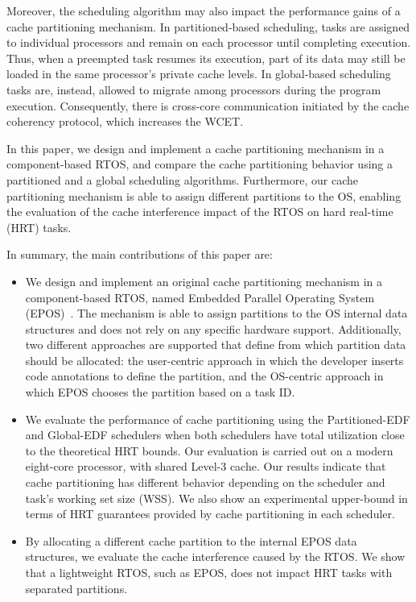 \documentclass[10pt, conference, compsocconf]{IEEEtran}
\begin{document}
Moreover, the scheduling algorithm may also impact the performance gains of a cache partitioning mechanism. In partitioned-based scheduling, tasks are assigned to individual processors and remain on each processor until completing execution. Thus, when a preempted task resumes its execution, part of its data may still be loaded in the same processor's private cache levels. In global-based scheduling tasks are, instead, allowed to migrate among processors during the program execution. Consequently, there is cross-core communication initiated by the cache coherency protocol, which increases the WCET. 

In this paper, we design and implement a cache partitioning mechanism in a component-based RTOS, and compare the cache partitioning behavior using a partitioned and a global scheduling algorithms. Furthermore, our cache partitioning mechanism is able to assign different partitions to the OS, enabling the evaluation of the cache interference impact of the RTOS on hard real-time (HRT) tasks.

In summary, the main contributions of this paper are:

\begin{itemize}
	\item We design and implement an original cache partitioning mechanism in a component-based RTOS, named Embedded Parallel Operating System (EPOS)~\cite{Froehlich:2001,epos}. The mechanism is able to assign partitions to the OS internal data structures and does not rely on any specific hardware support. Additionally, two different approaches are supported that define from which partition data should be allocated: the user-centric approach in which the developer inserts code annotations to define the partition, and the OS-centric approach in which EPOS chooses the partition based on a task ID. 
	
	\item We evaluate the performance of cache partitioning using the Partitioned-EDF and Global-EDF schedulers when both schedulers have total utilization close to the theoretical HRT bounds. Our evaluation is carried out on a modern eight-core processor, with shared Level-3 cache. Our results indicate that cache partitioning has different behavior depending on the scheduler and task's working set size (WSS). We also show an experimental upper-bound in terms of HRT guarantees provided by cache partitioning in each scheduler.
	
	\item By allocating a different cache partition to the internal EPOS data structures, we evaluate the cache interference caused by the RTOS. We show that a lightweight RTOS, such as EPOS, does not impact HRT tasks with separated partitions.
\end{itemize}
\end{document}
